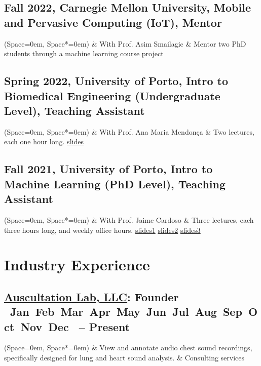 \documentclass[10pt,letterpaper,pdf]{article}
\newcommand{\DatestampYM}[2]{\mbox{\ShortMonth{#2} #1}}
\newcommand{\ShortMonth}[1]{%
\ifcase#1\relax
\or Jan%
\or Feb%
\or Mar%
\or Apr%
\or May%
\or Jun%
\or Jul%
\or Aug%
\or Sep%
\or Oct%
\or Nov%
\or Dec%
\fi}
\begin{document}
\subsection{\small Fall 2022, Carnegie Mellon University, Mobile and Pervasive Computing (IoT), Mentor}
\begin{easylist} \ListProperties(Space=0em, Space*=0em)
    & With Prof. Asim Smailagic
    & Mentor two PhD students through a machine learning course project
\end{easylist}

\subsection{\small Spring 2022, University of Porto, Intro to Biomedical Engineering (Undergraduate
Level), Teaching Assistant}
\begin{easylist} \ListProperties(Space=0em, Space*=0em)
    & With Prof. Ana Maria Mendon{\c{c}}a
    & Two lectures, each one hour long.  \href{https://docs.google.com/presentation/d/1lco5nlckinGk8RVHosJapeGzfjR6MUC9TbwOuRjUSms/edit?usp=sharing}{slides}
\end{easylist}

\subsection{\small Fall 2021, University of Porto, Intro to Machine Learning (PhD Level), Teaching Assistant}
\begin{easylist} \ListProperties(Space=0em, Space*=0em)
    & With Prof. Jaime Cardoso
    & Three lectures, each three hours long, and weekly office hours. \href{https://docs.google.com/presentation/d/1joBU3QM3jcpMYBDeFdvwiuDHdXrLZweiAiW1BgXMN7E/edit?usp=sharing}{slides1} \href{https://docs.google.com/presentation/d/1OkectcY5ImaDDD-a2M4ZRNoKgxxkM5DyoJ3oRK_vKn8/edit?usp=sharing}{slides2} \href{https://docs.google.com/presentation/d/14uhYMDF_xdyQosnJnFvr8sqUh31SGAtaN7V4Ob6f13Q/edit?usp=sharing}{slides3}
\end{easylist}


\section{Industry Experience}

\subsection{\small\href{http://www.nycmakerspace.org/}{Auscultation Lab, LLC}: Founder
\DatestampYM{2025}{04} -- Present }
\begin{easylist}[itemize] \ListProperties(Space=0em, Space*=0em)
  & View and annotate audio chest sound recordings, specifically designed for lung and heart sound analysis.
  & Consulting services
\end{easylist}
\end{document}
